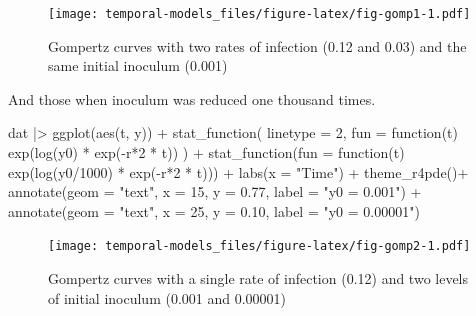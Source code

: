 \documentclass[
  letterpaper,
]{book}
\newenvironment{Shaded}{\begin{snugshade}}{\end{snugshade}}
\newcommand{\AttributeTok}[1]{\textcolor[rgb]{0.40,0.45,0.13}{#1}}
\newcommand{\ControlFlowTok}[1]{\textcolor[rgb]{0.00,0.23,0.31}{#1}}
\newcommand{\DecValTok}[1]{\textcolor[rgb]{0.68,0.00,0.00}{#1}}
\newcommand{\FloatTok}[1]{\textcolor[rgb]{0.68,0.00,0.00}{#1}}
\newcommand{\FunctionTok}[1]{\textcolor[rgb]{0.28,0.35,0.67}{#1}}
\newcommand{\NormalTok}[1]{\textcolor[rgb]{0.00,0.23,0.31}{#1}}
\newcommand{\SpecialCharTok}[1]{\textcolor[rgb]{0.37,0.37,0.37}{#1}}
\newcommand{\StringTok}[1]{\textcolor[rgb]{0.13,0.47,0.30}{#1}}
\begin{document}
\begin{figure}

\texttt{[image: temporal-models\_files/figure-latex/fig-gomp1-1.pdf]} \hfill{}

\caption{\label{fig-gomp1}Gompertz curves with two rates of infection
(0.12 and 0.03) and the same initial inoculum (0.001)}

\end{figure}

And those when inoculum was reduced one thousand times.

\begin{Shaded}
\begin{Highlighting}[]
\NormalTok{dat }\SpecialCharTok{|\textgreater{}}
  \FunctionTok{ggplot}\NormalTok{(}\FunctionTok{aes}\NormalTok{(t, y)) }\SpecialCharTok{+}
  \FunctionTok{stat\_function}\NormalTok{(}
    \AttributeTok{linetype =} \DecValTok{2}\NormalTok{,}
    \AttributeTok{fun =} \ControlFlowTok{function}\NormalTok{(t) }\FunctionTok{exp}\NormalTok{(}\FunctionTok{log}\NormalTok{(y0) }\SpecialCharTok{*} \FunctionTok{exp}\NormalTok{(}\SpecialCharTok{{-}}\NormalTok{r}\SpecialCharTok{*}\DecValTok{2} \SpecialCharTok{*}\NormalTok{ t))}
\NormalTok{  ) }\SpecialCharTok{+}
  \FunctionTok{stat\_function}\NormalTok{(}\AttributeTok{fun =} \ControlFlowTok{function}\NormalTok{(t) }\FunctionTok{exp}\NormalTok{(}\FunctionTok{log}\NormalTok{(y0}\SpecialCharTok{/}\DecValTok{1000}\NormalTok{) }\SpecialCharTok{*} \FunctionTok{exp}\NormalTok{(}\SpecialCharTok{{-}}\NormalTok{r}\SpecialCharTok{*}\DecValTok{2} \SpecialCharTok{*}\NormalTok{ t))) }\SpecialCharTok{+}
  \FunctionTok{labs}\NormalTok{(}\AttributeTok{x =} \StringTok{"Time"}\NormalTok{) }\SpecialCharTok{+}
 \FunctionTok{theme\_r4pde}\NormalTok{()}\SpecialCharTok{+}
  \FunctionTok{annotate}\NormalTok{(}\AttributeTok{geom =} \StringTok{"text"}\NormalTok{, }\AttributeTok{x =} \DecValTok{15}\NormalTok{, }\AttributeTok{y =} \FloatTok{0.77}\NormalTok{, }\AttributeTok{label =} \StringTok{"y0 = 0.001"}\NormalTok{) }\SpecialCharTok{+}
  \FunctionTok{annotate}\NormalTok{(}\AttributeTok{geom =} \StringTok{"text"}\NormalTok{, }\AttributeTok{x =} \DecValTok{25}\NormalTok{, }\AttributeTok{y =} \FloatTok{0.10}\NormalTok{, }\AttributeTok{label =} \StringTok{"y0 = 0.00001"}\NormalTok{)}
\end{Highlighting}
\end{Shaded}

\begin{figure}

\texttt{[image: temporal-models\_files/figure-latex/fig-gomp2-1.pdf]} \hfill{}

\caption{\label{fig-gomp2}Gompertz curves with a single rate of
infection (0.12) and two levels of initial inoculum (0.001 and 0.00001)}

\end{figure}
\end{document}
